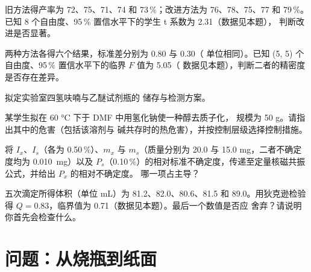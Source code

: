 \begin{exercise}[$\star\star$]\label{exo:b3:lab-techniques-3:7}
旧方法得产率为 72、75、71、74 和 73\,\%；改进方法为 76、78、75、77 和
79\,\%。已知 8 个自由度、95\,\% 置信水平下的学生 t 系数为 2.31（数据见本题），
判断改进是否显著。
\end{exercise}

\begin{exercise}[$\star\star$]\label{exo:b3:lab-techniques-3:8}
两种方法各得六个结果，标准差分别为 0.80 与 0.30（
单位相同）。已知 (5, 5) 个自由度、95\,\% 置信水平下的临界 $F$ 值为 5.05（
数据见本题），判断二者的精密度是否存在差异。
\end{exercise}

\begin{exercise}[$\star\star$]\label{exo:b3:lab-techniques-3:9}
拟定实验室四氢呋喃与乙醚试剂瓶的
储存与检测方案。
\end{exercise}

\begin{exercise}[$\star\star\star$]\label{exo:b3:lab-techniques-3:10}
某学生拟在 60 °C 下于 DMF 中用氢化钠使一种醇去质子化，
规模为 50 g。请指出其中的危害（包括该溶剂与
碱共存时的热危害），并按控制层级选择控制措施。
\end{exercise}

\begin{exercise}[$\star\star\star$]\label{exo:b3:lab-techniques-3:11}
将 $I_x$、$I_s$（各为 0.50\,\%）、$m_x$ 与 $m_s$（质量分别为 20.0
与 15.0 mg，二者不确定度均为 \qty{0.010}{mg}）以及 $P_s$（0.10\,\%）的相对标准不确定度，传递至定量核磁共振公式，并给出 $P_x$ 的相对不确定度。
哪一项占主导？
\end{exercise}

\begin{exercise}[$\star\star\star$]\label{exo:b3:lab-techniques-3:12}
五次滴定所得体积（单位 mL）为 81.2、82.0、80.6、81.5 和 89.0。用狄克逊检验得
$Q = 0.83$，临界值为 0.71（数据见本题）。最后一个数值是否应
舍弃？请说明你首先会检查什么。
\end{exercise}

\section{问题：从烧瓶到纸面}

